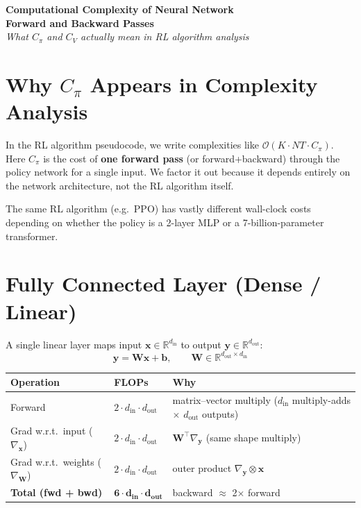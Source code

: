 \documentclass[11pt]{article}
\newcommand{\bigO}{\mathcal{O}}
\begin{document}
\begin{center}
{\Large\bfseries Computational Complexity of Neural Network\\Forward and Backward Passes}\\[8pt]
{\itshape What $C_\pi$ and $C_V$ actually mean in RL algorithm analysis}
\end{center}

\vspace{12pt}

\section{Why $C_\pi$ Appears in Complexity Analysis}

In the RL algorithm pseudocode, we write complexities like $\bigO(K \!\cdot\! NT \!\cdot\! C_\pi)$.
Here $C_\pi$ is the cost of \textbf{one forward pass} (or forward+backward) through the policy network for a single input.
We factor it out because it depends entirely on the network architecture, not the RL algorithm itself.

The same RL algorithm (e.g.\ PPO) has vastly different wall-clock costs depending on whether the policy is a 2-layer MLP or a 7-billion-parameter transformer.

\section{Fully Connected Layer (Dense / Linear)}

A single linear layer maps input $\mathbf{x} \in \mathbb{R}^{d_{\text{in}}}$ to output $\mathbf{y} \in \mathbb{R}^{d_{\text{out}}}$:
\[
\mathbf{y} = \mathbf{W}\mathbf{x} + \mathbf{b}, \qquad \mathbf{W} \in \mathbb{R}^{d_{\text{out}} \times d_{\text{in}}}
\]

\begin{center}
\renewcommand{\arraystretch}{1.3}
\begin{tabular}{lll}
\toprule
\textbf{Operation} & \textbf{FLOPs} & \textbf{Why} \\
\midrule
Forward & $2 \cdot d_{\text{in}} \cdot d_{\text{out}}$ & matrix--vector multiply ($d_{\text{in}}$ multiply-adds $\times$ $d_{\text{out}}$ outputs) \\
Grad w.r.t.\ input ($\nabla_{\mathbf{x}}$) & $2 \cdot d_{\text{in}} \cdot d_{\text{out}}$ & $\mathbf{W}^\top \nabla_{\mathbf{y}}$ (same shape multiply) \\
Grad w.r.t.\ weights ($\nabla_{\mathbf{W}}$) & $2 \cdot d_{\text{in}} \cdot d_{\text{out}}$ & outer product $\nabla_{\mathbf{y}} \otimes \mathbf{x}$ \\
\midrule
\textbf{Total (fwd + bwd)} & $\mathbf{6 \cdot d_{\text{in}} \cdot d_{\text{out}}}$ & backward $\approx$ 2$\times$ forward \\
\bottomrule
\end{tabular}
\end{center}
\end{document}

